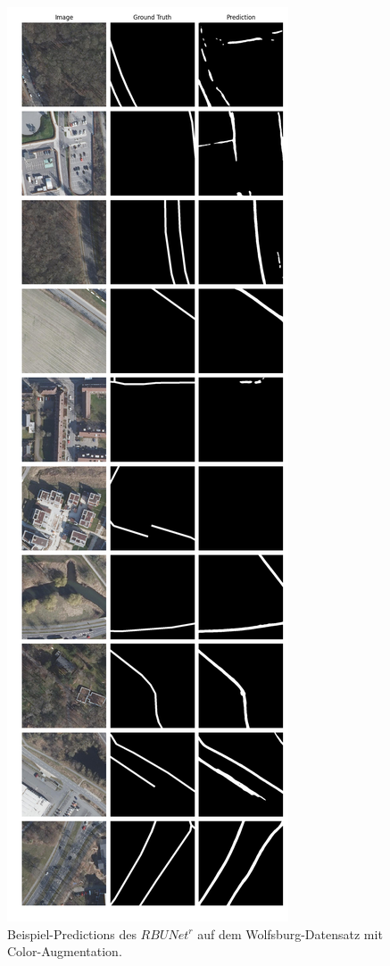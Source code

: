 \begin{figure}
	\centering
	\includegraphics[width=.41\textwidth]{Bilder/wolfsburg-color-samples/rbunet-r.png}
	\caption{Beispiel-Predictions des $RBUNet^r$ auf dem Wolfsburg-Datensatz mit Color-Augmentation.}
	\label{fig:wolfsburg-color-samples-rbunet-r}
\end{figure}




